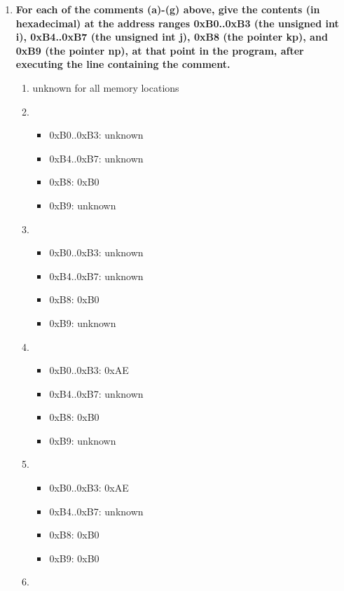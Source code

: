 \documentclass{article}
\begin{document}
\begin{enumerate}[label=\textbf{\arabic*})]
    \item \textbf{For each of the comments (a)-(g) above, give the contents (in hexadecimal) at the address ranges 0xB0..0xB3 (the unsigned int i), 0xB4..0xB7 (the unsigned int j), 0xB8 (the pointer kp), and 0xB9 (the pointer np), at that point in the program, after executing the line containing the comment.}
        \begin{enumerate}[label=\textbf{\alph*}.]
            \item unknown for all memory locations
            \item
            \begin{itemize}
                \item 0xB0..0xB3: unknown
                \item 0xB4..0xB7: unknown
                \item 0xB8: 0xB0
                \item 0xB9: unknown
            \end{itemize}
            \item
            \begin{itemize}
                \item 0xB0..0xB3: unknown
                \item 0xB4..0xB7: unknown
                \item 0xB8: 0xB0
                \item 0xB9: unknown
            \end{itemize}
            \item
            \begin{itemize}
                \item 0xB0..0xB3: 0xAE
                \item 0xB4..0xB7: unknown
                \item 0xB8: 0xB0
                \item 0xB9: unknown
            \end{itemize}
            \item
            \begin{itemize}
                \item 0xB0..0xB3: 0xAE
                \item 0xB4..0xB7: unknown
                \item 0xB8: 0xB0
                \item 0xB9: 0xB0
            \end{itemize}
            \item

\end{enumerate}
\end{enumerate}
\end{document}
